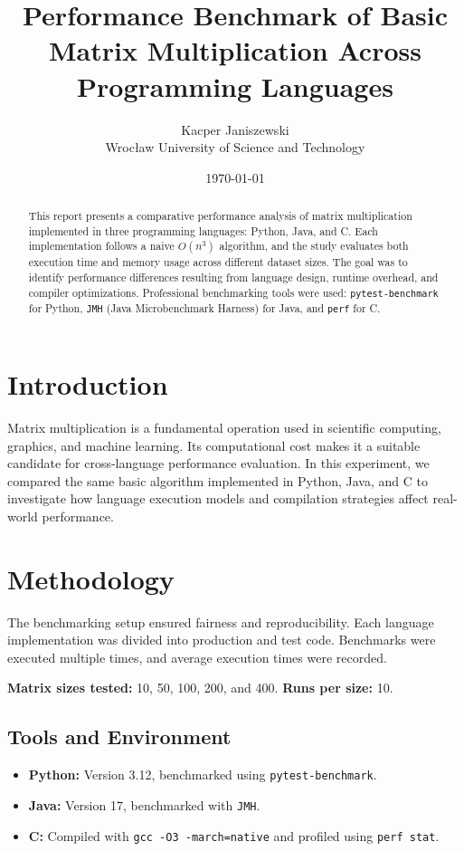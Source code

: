 \documentclass[12pt,a4paper]{article}
\title{\textbf{Performance Benchmark of Basic Matrix Multiplication Across Programming Languages}}
\author{Kacper Janiszewski \\ Wrocław University of Science and Technology}
\date{\today}
\begin{document}
\maketitle

\begin{abstract}
This report presents a comparative performance analysis of matrix multiplication implemented in three programming languages: Python, Java, and C. Each implementation follows a naive $O(n^3)$ algorithm, and the study evaluates both execution time and memory usage across different dataset sizes. The goal was to identify performance differences resulting from language design, runtime overhead, and compiler optimizations. Professional benchmarking tools were used: \texttt{pytest-benchmark} for Python, \texttt{JMH} (Java Microbenchmark Harness) for Java, and \texttt{perf} for C.
\end{abstract}

\section{Introduction}
Matrix multiplication is a fundamental operation used in scientific computing, graphics, and machine learning. Its computational cost makes it a suitable candidate for cross-language performance evaluation. In this experiment, we compared the same basic algorithm implemented in Python, Java, and C to investigate how language execution models and compilation strategies affect real-world performance.

\section{Methodology}
The benchmarking setup ensured fairness and reproducibility. Each language implementation was divided into production and test code. Benchmarks were executed multiple times, and average execution times were recorded.

\textbf{Matrix sizes tested:} 10, 50, 100, 200, and 400.  
\textbf{Runs per size:} 10.

\subsection{Tools and Environment}
\begin{itemize}
  \item \textbf{Python:} Version 3.12, benchmarked using \texttt{pytest-benchmark}.
  \item \textbf{Java:} Version 17, benchmarked with \texttt{JMH}.
  \item \textbf{C:} Compiled with \texttt{gcc -O3 -march=native} and profiled using \texttt{perf stat}.
\end{itemize}
\end{document}
